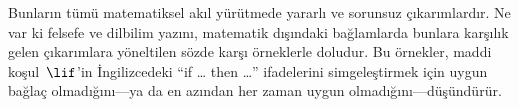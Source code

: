 Bunların tümü matematiksel akıl yürütmede yararlı ve sorunsuz çıkarımlardır.
Ne var ki felsefe ve dilbilim yazını, matematik dışındaki bağlamlarda bunlara
karşılık gelen çıkarımlara yöneltilen sözde karşı örneklerle doludur. Bu
örnekler, maddi koşul~$\lif$'in İngilizcedeki ``if \dots{} then \dots''
ifadelerini simgeleştirmek için uygun bağlaç olmadığını---ya da en azından
her zaman uygun olmadığını---düşündürür.

